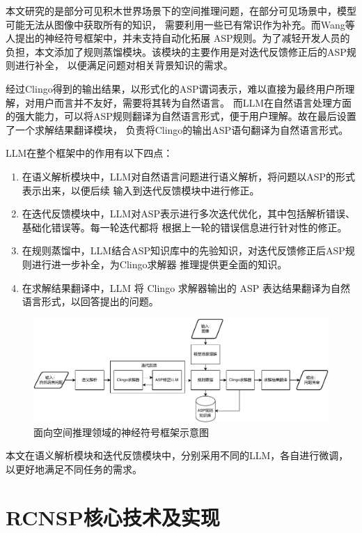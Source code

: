 本文研究的是部分可见积木世界场景下的空间推理问题，在部分可见场景中，模型可能无法从图像中获取所有的知识，
需要利用一些已有常识作为补充。而Wang\cite{wang2024dspy}等人提出的神经符号框架中，并未支持自动化拓展
ASP规则。为了减轻开发人员的负担，本文添加了规则蒸馏模块。该模块的主要作用是对迭代反馈修正后的ASP规则进行补全，
以便满足问题对相关背景知识的需求。

经过Clingo得到的输出结果，以形式化的ASP谓词表示，难以直接为最终用户所理解，对用户而言并不友好，需要将其转为自然语言。
而LLM在自然语言处理方面的强大能力，可以将ASP规则翻译为自然语言形式，便于用户理解。故在最后设置了一个求解结果翻译模块，
负责将Clingo的输出ASP语句翻译为自然语言形式。

LLM在整个框架中的作用有以下四点：
\begin{enumerate}[label=(\arabic*),itemsep=0pt,parsep=0pt]
    \item 在语义解析模块中，LLM对自然语言问题进行语义解析，将问题以ASP的形式表示出来，以便后续
输入到迭代反馈模块中进行修正。
    \item 在迭代反馈模块中，LLM对ASP表示进行多次迭代优化，其中包括解析错误、基础化错误等。每一轮迭代都将
根据上一轮的错误信息进行针对性的修正。
    \item 在规则蒸馏中，LLM结合ASP知识库中的先验知识，对迭代反馈修正后ASP规则进行进一步补全，为Clingo求解器
推理提供更全面的知识。
    \item 在求解结果翻译中，LLM 将 Clingo 求解器输出的 ASP 表达结果翻译为自然语言形式，以回答提出的问题。
\end{enumerate}
\begin{figure}
    \centering
    \includegraphics[width=\textwidth]{figures/pipeline-crop.pdf}
    \caption{面向空间推理领域的神经符号框架示意图}
    \label{fig:pipeline}
\end{figure}
本文在语义解析模块和迭代反馈模块中，分别采用不同的LLM，各自进行微调，以更好地满足不同任务的需求。
\section{RCNSP核心技术及实现}
